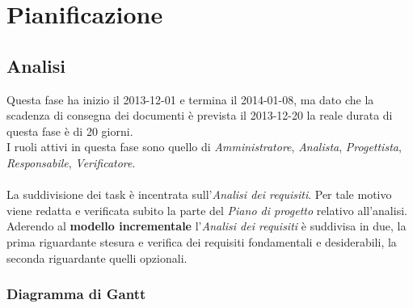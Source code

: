 \section{Pianificazione}
	\subsection{Analisi}

Questa fase ha inizio il 2013-12-01 e termina il 2014-01-08, ma dato che la scadenza di consegna dei documenti è prevista il 2013-12-20 la reale durata di questa fase è di 20 giorni. \\
I ruoli attivi in questa fase sono quello di \textit{Amministratore}, \textit{Analista}, \textit{Progettista}, \textit{Responsabile}, \textit{Verificatore}. \\ \\
La suddivisione dei task è incentrata sull'\textit{Analisi dei requisiti}. Per tale motivo viene redatta e verificata subito la parte del \textit{Piano di progetto} relativo all'analisi.
Aderendo al \textbf{modello incrementale} l'\textit{Analisi dei requisiti} è suddivisa in due, la prima riguardante stesura e verifica dei requisiti fondamentali e desiderabili, la seconda riguardante quelli opzionali.
\subsubsection{Diagramma di Gantt}


